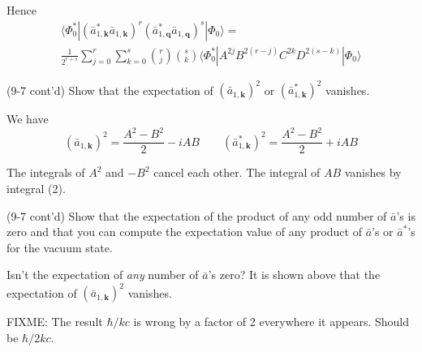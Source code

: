 \documentclass[12pt]{article}
\begin{document}
Hence
\begin{multline*}
\langle\Phi_0^*|
(\bar a_{1,\mathbf k}^*\bar a_{1,\mathbf k})^r
(\bar a_{1,\mathbf q}^*\bar a_{1,\mathbf q})^s
|\Phi_0\rangle={}
\\
\frac{1}{2^{r+s}}\sum_{j=0}^r\sum_{k=0}^s
\binom{r}{j}\binom{s}{k}
\langle\Phi_0^*|
A^{2j}B^{2(r-j)}C^{2k}D^{2(s-k)}
|\Phi_0\rangle
\end{multline*}

(9-7 cont'd)
Show that the expectation of 
$(\bar a_{1,\mathbf k})^2$ or
$(\bar a_{1,\mathbf k}^*)^2$ vanishes.

\bigskip
We have
\begin{equation*}
(\bar a_{1,\mathbf k})^2=\frac{A^2-B^2}{2}-iAB
\qquad
(\bar a_{1,\mathbf k}^*)^2=\frac{A^2-B^2}{2}+iAB
\end{equation*}

The integrals of $A^2$ and $-B^2$ cancel each other.
The integral of $AB$ vanishes by integral (2).

\bigskip
(9-7 cont'd)
Show that the expectation of the product of any odd number of
$\bar a$'s is zero and that you can compute the expectation value of
any product of $\bar a$'s or $\bar a^*$'s for the vacuum state.

\bigskip
Isn't the expectation of {\it any} number of $\bar a$'s zero?
It is shown above that the expectation of $(\bar a_{1,\mathbf k})^2$ vanishes.

\bigskip
FIXME: The result $\hbar/kc$ is wrong by a factor of 2 everywhere it appears.
Should be $\hbar/2kc$.
\end{document}
